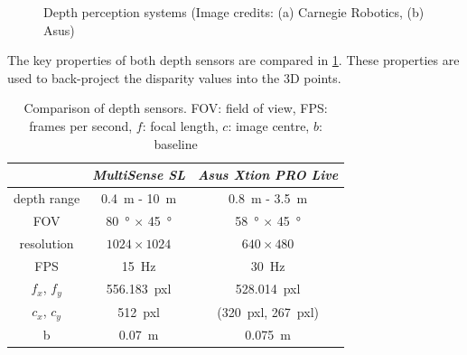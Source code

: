 \begin{figure}
\centering
\caption{Depth perception systems (Image credits: (a) Carnegie Robotics, (b) Asus)}
\label{fig:depth_sensors}
\end{figure}

The key properties of both depth sensors are compared in \cref{tab:depth_sensor_comparison}. These properties are used to back-project the disparity values into the 3D points.

\begin{table}
\captionsetup{width=0.7\textwidth}
\centering
\begin{tabular}{|c||c|c|}
\hline
 & \textit{MultiSense SL} & \textit{Asus Xtion PRO Live} \\
\hline
\hline
depth range & \SI{0.4}{\meter} - \SI{10}{\meter} & \SI{0.8}{\meter} - \SI{3.5}{\meter} \\
\hline
FOV & \SI{80}{\degree} $\times$ \SI{45}{\degree} & \SI{58}{\degree} $\times$ \SI{45}{\degree} \\
\hline
resolution & $1024 \times 1024$ & $640 \times 480$ \\
\hline
FPS & \SI{15}{\hertz} & \SI{30}{\hertz} \\
\hline
$f_x$, $f_y$ & \SI{556.183}{pxl} & \SI{528.014}{pxl} \\
\hline
$c_x$, $c_y$ & \SI{512}{pxl} & (\SI{320}{pxl}, \SI{267}{pxl}) \\
\hline
b & \SI{0.07}{\meter} & \SI{0.075}{\meter} \\
\hline
\end{tabular}
\caption{Comparison of depth sensors. FOV: field of view, FPS: frames per second, $f$: focal length, $c$: image centre, $b$: baseline}
\label{tab:depth_sensor_comparison}
\end{table}



